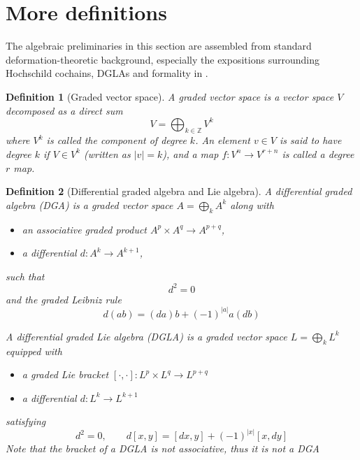 \documentclass[
  12pt,
  a4paper, oneside
]{report}
\theoremstyle{bolddef}
\newtheorem{definition}{Definition}
\theoremstyle{remark}
\numberwithin{equation}{chapter}
\begin{document}
\section{More definitions}
The algebraic preliminaries in this section are assembled from standard deformation-theoretic background, especially the expositions surrounding Hochschild cochains, DGLAs and formality in \cite{GraciaSaz2003,Kontsevich2003}.

\begin{definition}[Graded vector space]
A \emph{graded vector space} is a vector space $V$ decomposed as a direct sum
$$
V = \bigoplus_{k\in\mathbb{Z}} V^k 
$$
where $V^k$ is called the component of degree $k$. 
An element $v\in V$ is said to have degree $k$ if $V \in V^{k}$ (written as $|v|=k$), and a map $f : V^{n} \longrightarrow V^{r+n}$ is called a degree $r$ map. \\
\end{definition}


\begin{definition}[Differential graded algebra and Lie algebra]
A \emph{differential graded algebra} (DGA) is a graded vector space 
$A=\bigoplus_k A^k$ along with

\begin{itemize}
\item an associative graded product $A^p\times A^q \to A^{p+q}$,
\item a differential $d:A^k\to A^{k+1}$,
\end{itemize}

such that
$$
d^2=0
$$
and the graded Leibniz rule 
$$
d(ab)= (da)b + (-1)^{|a|} a(db)
$$

A \emph{differential graded Lie algebra} (DGLA) is a graded vector space 
$L=\bigoplus_k L^k$ equipped with

\begin{itemize}
\item a graded Lie bracket $[\cdot,\cdot]:L^p\times L^q \to L^{p+q}$
\item a differential $d:L^k\to L^{k+1}$
\end{itemize}

satisfying
$$
d^2=0, \qquad
d[x,y] = [dx,y] + (-1)^{|x|}[x,dy]
$$
Note that the bracket of a DGLA is not associative, thus it is not a DGA
\end{definition}
\end{document}
